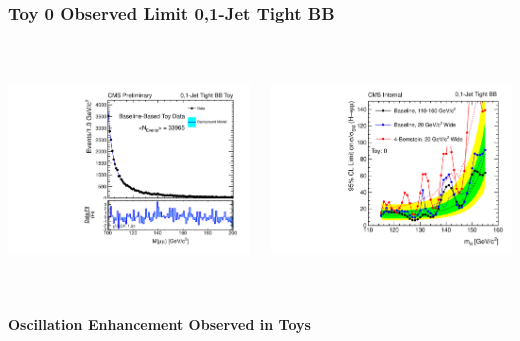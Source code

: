 \documentclass{beamer}
\begin{document}
\begin{frame}
\frametitle{Toy 0 Observed Limit 0,1-Jet Tight BB}
  \vspace{-1.5em}
  \begin{columns}[c]
    \column{60mm}
      \begin{center}
         \includegraphics[height=60mm]{wigglesStudy/toyFit1_Jets01PassPtG10BB_8TeV.pdf}
      \end{center}
    \column{60mm}
      \begin{center}
         \includegraphics[height=60mm]{wigglesStudy/compareLimits_TightBB_toy0.pdf}
      \end{center}
  \end{columns}
  \begin{center}
    \textbf{Oscillation Enhancement Observed in Toys}
  \end{center}
\end{frame}
\end{document}
